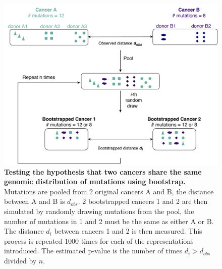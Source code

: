\begin{figure}[h!]
    \centering
    \includegraphics[scale=0.6]{graphics/bootstrap_demo.pdf}
    \caption{\textbf{Testing the hypothesis that two cancers share the same genomic distribution of mutations using bootstrap.} Mutations are pooled from 2 original cancers A and B, the distance between A and B is $d_{obs}$. 2 bootstrapped cancers 1 and 2 are then simulated by randomly drawing mutations from the pool, the number of mutations in 1 and 2 must be the same as either A or B. The distance $d_i$ between cancers 1 and 2 is then measured. This process is repeated 1000 times for each of the representations introduced. The estimated p-value is the number of times $d_i > d_{obs}$ divided by $n$.}
    \label{fig:bootstrap_demo}
\end{figure}
